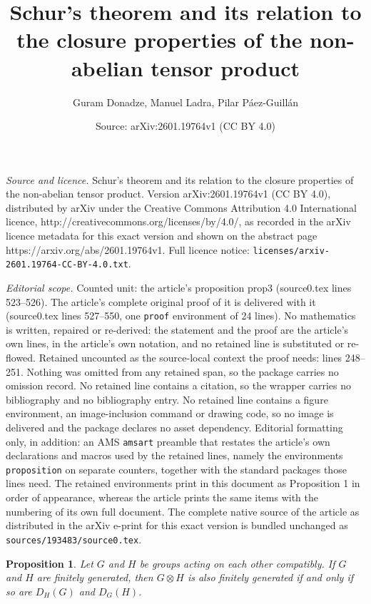 \documentclass[10pt,a4paper]{amsart}
\title{Schur's theorem and its relation to the closure properties of the non-abelian tensor product}
\author{Guram Donadze, Manuel Ladra, Pilar P\'aez-Guill\'an}
\date{Source: arXiv:2601.19764v1 (CC BY 4.0)}
\newtheorem{proposition}{Proposition}
\begin{document}
\maketitle

\noindent\emph{Source and licence.} Schur's theorem and its relation to the closure properties of the non-abelian tensor product. Version arXiv:2601.19764v1 (CC BY 4.0), distributed by arXiv under the Creative Commons Attribution 4.0 International licence, http://creativecommons.org/licenses/by/4.0/, as recorded in the arXiv licence metadata for this exact version and shown on the abstract page https://arxiv.org/abs/2601.19764v1. Full licence notice: \texttt{licenses/arxiv-2601.19764-CC-BY-4.0.txt}.\par\smallskip

\noindent\textit{Editorial scope.} Counted unit: the article's proposition prop3 (source0.tex lines 523--526). The article's complete original proof of it is delivered with it (source0.tex lines 527--550, one \texttt{proof} environment of 24 lines). No mathematics is written, repaired or re-derived: the statement and the proof are the article's own lines, in the article's own notation, and no retained line is substituted or re-flowed.  Retained uncounted as the source-local context the proof needs: lines 248--251.  Nothing was omitted from any retained span, so the package carries no omission record.  No retained line contains a citation, so the wrapper carries no bibliography and no bibliography entry.  No retained line contains a figure environment, an image-inclusion command or drawing code, so no image is delivered and the package declares no asset dependency.  Editorial formatting only, in addition: an AMS \texttt{amsart} preamble that restates the article's own declarations and macros used by the retained lines, namely the environments \texttt{proposition} on separate counters, together with the standard packages those lines need.  The retained environments print in this document as Proposition 1 in order of appearance, whereas the article prints the same items with the numbering of its own full document.  The complete native source of the article as distributed in the arXiv e-print for this exact version is bundled unchanged as \texttt{sources/193483/source0.tex}.
\begin{proposition}\label{paper5}
Let $G$ and $H$ be groups acting on each other compatibly. If $G$ and $H$ are finitely generated, then $G\otimes H$ is also finitely generated if and only if so are
$D_H(G)$ and $D_G(H)$.
\end{proposition}
\end{document}
